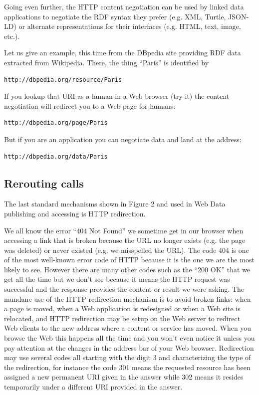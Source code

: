Going even further, the HTTP content negotiation can be used by linked
data applications to negotiate the RDF syntax they prefer (e.g. XML,
Turtle, JSON-LD) or alternate representations for their interfaces (e.g.
HTML, text, image, etc.).

Let us give an example, this time from the DBpedia site providing RDF
data extracted from Wikipedia. There, the thing ``Paris'' is identified
by

\begin{lstlisting}
http://dbpedia.org/resource/Paris
\end{lstlisting}

If you lookup that URI as a human in a Web browser (try it) the content
negotiation will redirect you to a Web page for humans:

\begin{lstlisting}
http://dbpedia.org/page/Paris
\end{lstlisting}

But if you are an application you can negotiate data and land at the
address:

\begin{lstlisting}
http://dbpedia.org/data/Paris
\end{lstlisting}

\hypertarget{rerouting-calls}{%
\subsection{Rerouting calls}\label{rerouting-calls}}

The last standard mechanisms shown in Figure 2 and used in Web Data
publishing and accessing is HTTP redirection.

We all know the error ``404 Not Found'' we sometime get in our browser
when accessing a link that is broken because the URL no longer exists
(e.g. the page was deleted) or never existed (e.g. we misspelled the
URL). The code 404 is one of the most well-known error code of HTTP
because it is the one we are the most likely to see. However there are
many other codes such as the ``200 OK'' that we get all the time but we
don't see because it means the HTTP request was successful and the
response provides the content or result we were asking. The mundane use
of the HTTP redirection mechanism is to avoid broken links: when a page
is moved, when a Web application is redesigned or when a Web site is
relocated, and HTTP redirection may be setup on the Web server to
redirect Web clients to the new address where a content or service has
moved. When you browse the Web this happens all the time and you won't
even notice it unless you pay attention at the changes in the address
bar of your Web browser. Redirection may use several codes all starting
with the digit 3 and characterizing the type of the redirection, for
instance the code 301 means the requested resource has been assigned a
new permanent URI given in the answer while 302 means it resides
temporarily under a different URI provided in the answer.

